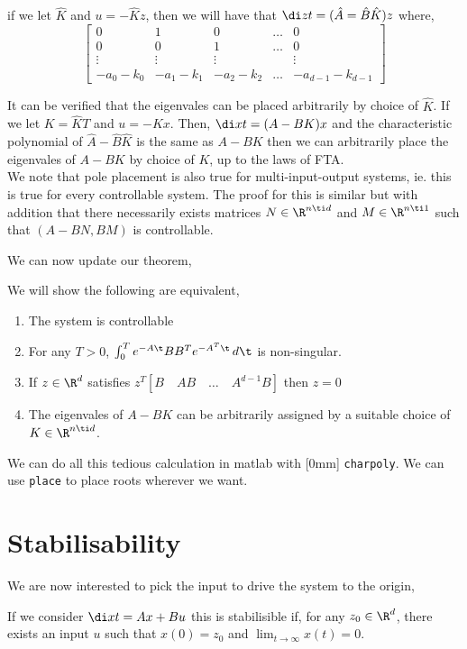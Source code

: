 if we let $\hat K$ and $u = -\hat K z$, then we will have that $\di z t = (\hat A = \hat B \hat K)z$ where,
$$ \begin{bmatrix}
  0 & 1 & 0 & \dots & 0 \\
  0 & 0 & 1 & \dots & 0 \\
  \vdots & \vdots & \vdots && \vdots\\
  -a_0 - k_0 & -a_1-k_1 & -a_2-k_2 & \dots & - a_{d-1} - k_{d-1}
\end{bmatrix} $$

It can be verified that the eigenvales can be placed arbitrarily by choice of $\hat K$. If we let $K = \hat K T$ and $u = - Kx$. Then, $\di x t = (A - BK)x$ and the characteristic polynomial of $\hat A - \hat B\hat K$ is the same as $A - BK$ then we can arbitrarily place the eigenvales of $A - BK$ by choice of $K$, up to the laws of FTA.\\

We note that pole placement is also true for multi-input-output systems, ie. this is true for every controllable system. The proof for this is similar but with addition that there necessarily exists matrices $N\in \R^{n\ti d}$ and $M \in \R^{n\ti 1}$ such that $(A - BN, BM)$ is controllable.

We can now update our theorem,
\begin{nthm}
  We will show the following are equivalent,
  \begin{enumerate}
    \item The system is controllable
    \item For any $T > 0$, $\int_0^T e^{-A\t}BB^T e^{-A^T\t}\,d\t$ is non-singular.
    \item If $z \in \R^d$ satisfies $z^T [B \quad AB \quad \dots \quad A^{d-1}B]$ then $z = 0$
    \item The eigenvales of $A - BK$ can be arbitrarily assigned by a suitable choice of $K \in \R^{n \ti d}$.
  \end{enumerate}
\end{nthm}

We can do all this tedious calculation in matlab with [0mm] \texttt{charpoly}. We can use \texttt{place} to place roots wherever we want.

\section{Stabilisability}
We are now interested to pick the input to drive the system to the origin,
\begin{ndefi}[Stabilisability]
  If we consider $\di x t = Ax + Bu$ this is stabilisible if, for any $z_0 \in \R^d$, there exists an input $u$ such that $x(0) = z_0$ and $\lim_{t\to\infty} x(t) = 0$.
\end{ndefi}

